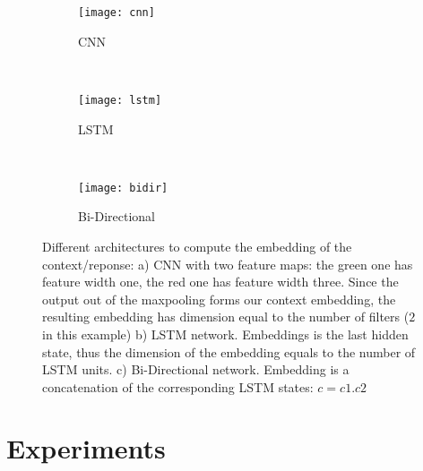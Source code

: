 \documentclass{article} \usepackage{nips15submit_e,times}
\begin{document}
\begin{figure}
    \centering
    \begin{subfigure}[b]{0.35\textwidth}
        \texttt{[image: cnn]}
        \caption{CNN}
        \label{fig:cnn}
    \end{subfigure}
    ~ \quad \begin{subfigure}[b]{0.2\textwidth}
        \texttt{[image: lstm]}
        \caption{LSTM}
        \label{fig:lstm}
    \end{subfigure}
    ~ \quad \begin{subfigure}[b]{0.2\textwidth}
        \texttt{[image: bidir]}
        \caption{Bi-Directional}
        \label{fig:bidirect}
    \end{subfigure}
    \caption{
    Different architectures to compute the embedding of the context/reponse:
    a) CNN with two feature maps: the green one has feature width one, the red one has feature width three.
        Since the output out of the maxpooling forms our context embedding, the resulting embedding has dimension equal to the number of filters ($2$ in this example)
    b) LSTM network. Embeddings is the last hidden state, thus the dimension of the embedding equals to the number of LSTM units.
    c) Bi-Directional network. Embedding is a concatenation of the corresponding LSTM states: $c = c1.c2$
    }
    \label{fig:animals}
\end{figure}



\section{Experiments}
\end{document}
